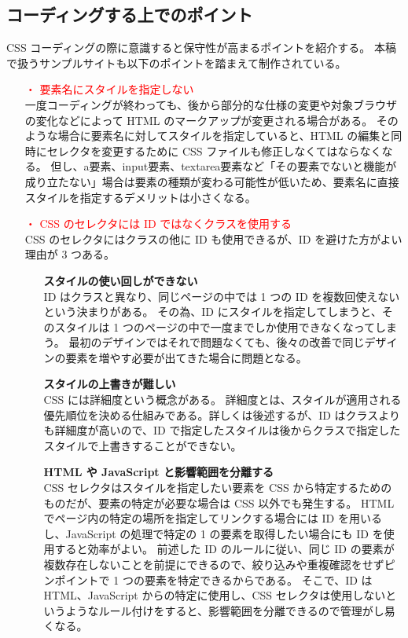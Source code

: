 \subsection{コーディングする上でのポイント}
CSS コーディングの際に意識すると保守性が高まるポイントを紹介する。
本稿で扱うサンプルサイトも以下のポイントを踏まえて制作されている。
\begin{itemize}\setlength{\leftskip}{-1.00zw}%
\item[\textcolor{red}{・}] \textcolor{red}{要素名にスタイルを指定しない} \\
  一度コーディングが終わっても、後から部分的な仕様の変更や対象ブラウザの変化などによって HTML のマークアップが変更される場合がある。
  そのような場合に要素名に対してスタイルを指定していると、HTML の編集と同時にセレクタを変更するために CSS ファイルも修正しなくてはならなくなる。
  但し、a要素、input要素、textarea要素など「その要素でないと機能が成り立たない」場合は要素の種類が変わる可能性が低いため、要素名に直接スタイルを指定するデメリットは小さくなる。
\item[\textcolor{red}{・}] \textcolor{red}{CSS のセレクタには ID ではなくクラスを使用する} \\
  CSS のセレクタにはクラスの他に ID も使用できるが、ID を避けた方がよい理由が 3 つある。\enlargethispage{0.50zw}
  \begin{itemize}\setlength{\leftskip}{-1.00zw}%
  \item[\ajMaru{1}] \textbf{スタイルの使い回しができない} \\
    ID はクラスと異なり、同じページの中では 1 つの ID を複数回使えないという決まりがある。
    その為、ID にスタイルを指定してしまうと、そのスタイルは 1 つのページの中で一度までしか使用できなくなってしまう。
    最初のデザインではそれで問題なくても、後々の改善で同じデザインの要素を増やす必要が出てきた場合に問題となる。
  \item[\ajMaru{2}] \textbf{スタイルの上書きが難しい} \\
    CSS には詳細度という概念がある。
    詳細度とは、スタイルが適用される優先順位を決める仕組みである。詳しくは後述するが、ID はクラスよりも詳細度が高いので、ID で指定したスタイルは後からクラスで指定したスタイルで上書きすることができない。
  \item[\ajMaru{3}] \textbf{HTML や JavaScript と影響範囲を分離する} \\
    CSS セレクタはスタイルを指定したい要素を CSS から特定するためのものだが、要素の特定が必要な場合は CSS 以外でも発生する。
    HTML でページ内の特定の場所を指定してリンクする場合には ID を用いるし、JavaScript の処理で特定の 1 の要素を取得したい場合にも ID を使用すると効率がよい。
    前述した ID のルールに従い、同じ ID の要素が複数存在しないことを前提にできるので、絞り込みや重複確認をせずピンポイントで 1 つの要素を特定できるからである。
    そこで、ID は HTML、JavaScript からの特定に使用し、CSS セレクタは使用しないというようなルール付けをすると、影響範囲を分離できるので管理がし易くなる。
  \end{itemize}

\end{itemize}
